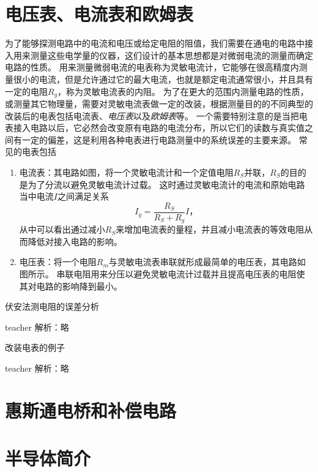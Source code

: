 \section{电压表、电流表和欧姆表}
为了能够探测电路中的电流和电压或给定电阻的阻值，我们需要在通电的电路中接入用来测量这些电学量的仪器，这们设计的基本思想都是对微弱电流的测量而确定电路的性质。
用来测量微弱电流的电表称为{\heiti 灵敏电流计}，它能够在很高精度内测量很小的电流，但是允许通过它的最大电流，也就是额定电流通常很小，并且具有一定的电阻$R_g$，称为灵敏电流表的内阻。
为了在更大的范围内测量电路的性质，或测量其它物理量，需要对灵敏电流表做一定的改装，根据测量目的的不同典型的改装后的电表包括{\heiti 电流表}、\emph{电压表}以及\emph{欧姆表}等。
一个需要特别注意的是当把电表接入电路以后，它必然会改变原有电路的电流分布，所以它们的读数与真实值之间有一定的偏差，这是利用各种电表进行电路测量中的{\heiti 系统误差}的主要来源。
常见的电表包括
\begin{enumerate}
\item 电流表：其电路如图，将一个灵敏电流计和一个定值电阻$R_S$并联，$R_S$的目的是为了分流以避免灵敏电流计过载。
这时通过灵敏电流计的电流和原始电路当中电流$I$之间满足关系
\begin{equation}
I_g = \frac{R_S}{R_S+R_g}I，
\end{equation}
从中可以看出通过减小$R_S$来增加电流表的量程，并且减小电流表的等效电阻从而降低对接入电路的影响。


\item 电压表：将一个电阻$R_m$与灵敏电流表串联就形成最简单的电压表，其电路如图所示。
串联电阻用来分压以避免灵敏电流计过载并且提高电压表的电阻使其对电路的影响降到最小。

\end{enumerate}

\begin{example}
伏安法测电阻的误差分析
\begin{taggedblock}{teacher}
\newline
解析：略
\end{taggedblock}
\end{example}

\begin{example}
改装电表的例子
\begin{taggedblock}{teacher}
\newline
解析：略
\end{taggedblock}
\end{example}

\section{惠斯通电桥和补偿电路}

\section{半导体简介}
